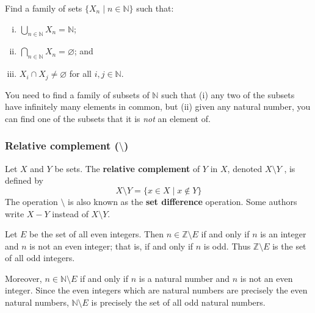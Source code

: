 \begin{exercise}
\label{exSubsetsFiniteIntersectionInhabitedInfiniteIntersectionEmpty}
Find a family of sets $\{ X_n \mid n \in \mathbb{N} \}$ such that:
\begin{enumerate}[(i)]
\item $\displaystyle\bigcup_{n \in \mathbb{N}} X_n = \mathbb{N}$;
\item $\displaystyle\bigcap_{n \in \mathbb{N}} X_n = \varnothing$; and
\item $X_i \cap X_j \ne \varnothing$ for all $i,j \in \mathbb{N}$.
\end{enumerate}
\begin{backhint}
You need to find a family of subsets of $\mathbb{N}$ such that (i) any two of the subsets have infinitely many elements in common, but (ii) given any natural number, you can find one of the subsets that it is \textit{not} an element of.
\end{backhint}
\end{exercise}

\subsubsection*{Relative complement ($\setminus$)}

\begin{definition}
\label{defRelativeComplement}
Let $X$ and $Y$ be sets. The \textbf{relative complement} of $Y$ in $X$, denoted $X \setminus Y$ , is defined by
\[ X \setminus Y = \{ x \in X \mid x \not \in Y \} \]
The operation $\setminus$ is also known as the \textbf{set difference} operation. Some authors write $X - Y$ instead of $X \setminus Y$.
\end{definition}

\begin{example}
Let $E$ be the set of all even integers. Then $n \in \mathbb{Z} \setminus E$ if and only if $n$ is an integer and $n$ is not an even integer; that is, if and only if $n$ is odd. Thus $\mathbb{Z} \setminus E$ is the set of all odd integers.

Moreover, $n \in \mathbb{N} \setminus E$ if and only if $n$ is a natural number and $n$ is not an even integer. Since the even integers which are natural numbers are precisely the even natural numbers, $\mathbb{N} \setminus E$ is precisely the set of all odd natural numbers.
\end{example}

